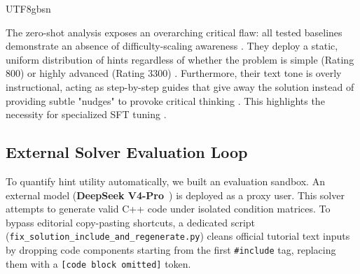 \documentclass{article}
\begin{document}
\begin{CJK*}{UTF8}{gbsn}
\begin{table}[th]
  \caption{Zero-Shot Multi-Model Hint Performance Metrics \cite{codeforces2023}}
  \label{tab:baseline_metrics}
  \centering
\end{table}

The zero-shot analysis exposes an overarching critical flaw: all tested baselines demonstrate an absence of difficulty-scaling awareness \cite{codeforces2023}. They deploy a static, uniform distribution of hints regardless of whether the problem is simple (Rating 800) or highly advanced (Rating 3300) \cite{codeforces2023}. Furthermore, their text tone is overly instructional, acting as step-by-step guides that give away the solution instead of providing subtle "nudges" to provoke critical thinking \cite{codeforces2023}. This highlights the necessity for specialized SFT tuning \cite{codeforces2023}.

\subsection{External Solver Evaluation Loop}
To quantify hint utility automatically, we built an evaluation sandbox. An external model (\textbf{DeepSeek V4-Pro}~\cite{deepseek_v4_preview}) is deployed as a proxy user. This solver attempts to generate valid C++ code under isolated condition matrices. 
To bypass editorial copy-pasting shortcuts, a dedicated script (\texttt{fix\_solution\_include\_and\_regenerate.py}) cleans official tutorial text inputs by dropping code components starting from the first \texttt{\#include} tag, replacing them with a \texttt{[code block omitted]} token.


\end{CJK*}
\end{document}
